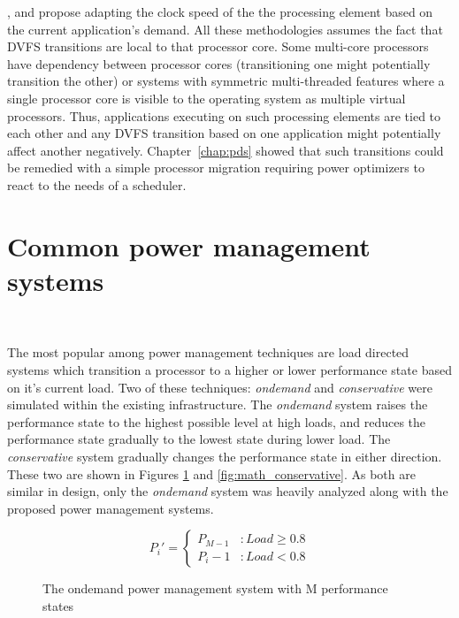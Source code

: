 \cite{AnIntraTask}, \cite{LiveRuntime} and \cite{Phaseaware} propose adapting the clock speed of the the processing element based
on the current application's demand. All these methodologies assumes the fact that DVFS transitions
are local to that processor core. Some multi-core processors have dependency between 
processor cores (transitioning one might potentially transition the other) or systems with 
symmetric multi-threaded features where a single processor
core is visible to the operating system as multiple virtual processors. Thus, applications
executing on such processing elements are tied to each other and any DVFS
transition based on one application might potentially affect another negatively. 
Chapter~\ref{chap:pds} showed that such transitions could be remedied with a simple processor migration
requiring power optimizers to react to the needs of a scheduler.

\section{Common power management systems}~\label{sec:common_pow}

The most popular among power management techniques are load directed systems
which transition a processor to a higher or lower performance state based on it's current load. Two
of these techniques: \textit{ondemand}\cite{OnDemand} and \textit{conservative} 
were simulated within the existing infrastructure. The \textit{ondemand}
system raises the performance state to the highest possible level at high loads, and
reduces the performance state gradually to the lowest state during lower load.
The \textit{conservative}
system gradually changes the performance state in either direction. These two are 
shown in Figures \ref{fig:math_ondemand} and \ref{fig:math_conservative}. As both 
are similar in design, only the \textit{ondemand} system was heavily analyzed 
along with the proposed power management systems.

\begin{figure}[h!]
\centering
\begin{equation*}
    P_{i}' = \left\{ \begin{array}{lr} 
                   P_{M-1} & : Load \geq 0.8 \\
		   P_{i}-1 & : Load < 0.8
                  \end{array} \right.
\end{equation*}
\caption{The ondemand power management system with M performance states}
\label{fig:math_ondemand}
\end{figure}

